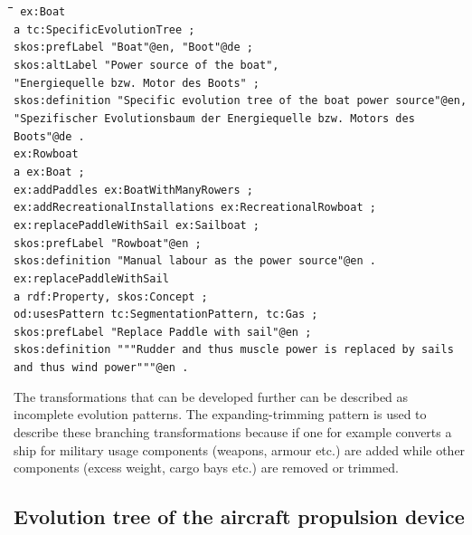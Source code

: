 \documentclass[11pt,a4paper]{article}
\newenvironment{code}{\tt \begin{tabbing}
\hskip12pt\=\hskip12pt\=\hskip12pt\=\hskip12pt\=\hskip5cm\=\hskip5cm\=\kill}
{\end{tabbing}}
\begin{document}
\begin{code}\tt
ex:Boat \\
\> a tc:SpecificEvolutionTree ; \\
\> skos:prefLabel "Boat"@en, "Boot"@de ; \\
\> skos:altLabel "Power source of the boat", \\
\>\> "Energiequelle bzw. Motor des Boots" ; \\
\> skos:definition "Specific evolution tree of the boat power source"@en, \\
\>\> "Spezifischer Evolutionsbaum der Energiequelle bzw. Motors des Boots"@de
.  \\[4pt]

ex:Rowboat \\
\> a ex:Boat ; \\ 
\> ex:addPaddles ex:BoatWithManyRowers ; \\
\> ex:addRecreationalInstallations ex:RecreationalRowboat ; \\
\> ex:replacePaddleWithSail ex:Sailboat ; \\
\> skos:prefLabel "Rowboat"@en ; \\
\> skos:definition "Manual labour as the power source"@en . \\[4pt]

ex:replacePaddleWithSail \\
\> a rdf:Property, skos:Concept ; \\
\> od:usesPattern tc:SegmentationPattern, tc:Gas ; \\
\> skos:prefLabel "Replace Paddle with sail"@en ; \\
\> skos:definition """Rudder and thus muscle power is replaced by sails \\
\>\> and thus wind power"""@en .
    
\end{code}

The transformations that can be developed further can be described as
incomplete evolution patterns. The expanding-trimming pattern is used to
describe these branching transformations because if one for example converts a
ship for military usage components (weapons, armour etc.) are added while
other components (excess weight, cargo bays etc.) are removed or trimmed. 

\subsection{Evolution tree of the aircraft propulsion device}
\end{document}
